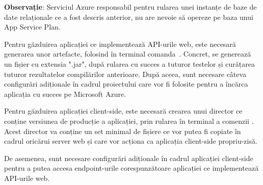 \textbf{Observație}: Serviciul Azure responsabil pentru rularea unei instanțe de baze de date relaționale ce a fost descris anterior, nu are nevoie să opereze pe baza unui App Service Plan.\newline

Pentru găzduirea aplicației ce implementează API-urile web, este necesară generarea unor artefacte, folosind în terminal comanda \,. Concret, se generează un fișier cu extensia ".jar", după rularea cu succes a tuturor testelor și curățarea tuturor rezultatelor compilărilor anterioare. După aceea, sunt necesare câteva configurări adiționale în cadrul proiectului care vor fi folosite pentru a încărca aplicația cu succes pe Microsoft Azure.\newline

Pentru găzduirea aplicației client-side, este necesară crearea unui director ce conține versiunea de producție a aplicației, prin rularea în terminal a comenzii . Acest director va conține un set minimal de fișiere ce vor putea fi copiate în cadrul oricărui server web și care vor acționa ca aplicația client-side propriu-zisă.\newline

De asemenea, sunt necesare configurări adiționale în cadrul aplicației client-side pentru a putea accesa endpoint-urile corespunzătoare aplicației ce implementează API-urile web.

\label{chap:03}